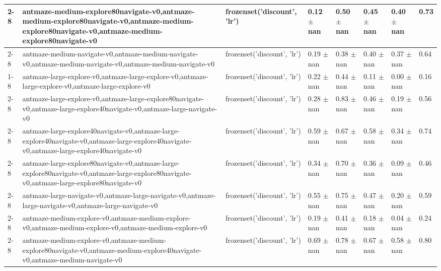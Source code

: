 \begin{tabular}{llllllll}
\cline{2-8}
 & antmaze-medium-explore80navigate-v0,antmaze-medium-explore80navigate-v0,antmaze-medium-explore80navigate-v0,antmaze-medium-explore80navigate-v0 & frozenset({'discount', 'lr'}) & 0.12 $\pm$ nan & 0.50 $\pm$ nan & 0.45 $\pm$ nan & 0.40 $\pm$ nan & 0.73 \\
\cline{2-8}
 & antmaze-medium-navigate-v0,antmaze-medium-navigate-v0,antmaze-medium-navigate-v0,antmaze-medium-navigate-v0 & frozenset({'discount', 'lr'}) & 0.19 $\pm$ nan & 0.38 $\pm$ nan & 0.40 $\pm$ nan & 0.37 $\pm$ nan & 0.64 \\
\cline{1-8} \cline{2-8}
\multirow[t]{10}{*}{QRL} & antmaze-large-explore-v0,antmaze-large-explore-v0,antmaze-large-explore-v0,antmaze-large-explore-v0 & frozenset({'discount', 'lr'}) & 0.22 $\pm$ nan & 0.44 $\pm$ nan & 0.11 $\pm$ nan & 0.00 $\pm$ nan & 0.16 \\
\cline{2-8}
 & antmaze-large-explore-v0,antmaze-large-explore80navigate-v0,antmaze-large-explore40navigate-v0,antmaze-large-navigate-v0 & frozenset({'discount', 'lr'}) & 0.28 $\pm$ nan & 0.83 $\pm$ nan & 0.46 $\pm$ nan & 0.19 $\pm$ nan & 0.56 \\
\cline{2-8}
 & antmaze-large-explore40navigate-v0,antmaze-large-explore40navigate-v0,antmaze-large-explore40navigate-v0,antmaze-large-explore40navigate-v0 & frozenset({'discount', 'lr'}) & 0.59 $\pm$ nan & 0.67 $\pm$ nan & 0.58 $\pm$ nan & 0.34 $\pm$ nan & 0.74 \\
\cline{2-8}
 & antmaze-large-explore80navigate-v0,antmaze-large-explore80navigate-v0,antmaze-large-explore80navigate-v0,antmaze-large-explore80navigate-v0 & frozenset({'discount', 'lr'}) & 0.34 $\pm$ nan & 0.70 $\pm$ nan & 0.36 $\pm$ nan & 0.09 $\pm$ nan & 0.46 \\
\cline{2-8}
 & antmaze-large-navigate-v0,antmaze-large-navigate-v0,antmaze-large-navigate-v0,antmaze-large-navigate-v0 & frozenset({'discount', 'lr'}) & 0.55 $\pm$ nan & 0.75 $\pm$ nan & 0.47 $\pm$ nan & 0.20 $\pm$ nan & 0.59 \\
\cline{2-8}
 & antmaze-medium-explore-v0,antmaze-medium-explore-v0,antmaze-medium-explore-v0,antmaze-medium-explore-v0 & frozenset({'discount', 'lr'}) & 0.19 $\pm$ nan & 0.41 $\pm$ nan & 0.18 $\pm$ nan & 0.04 $\pm$ nan & 0.24 \\
\cline{2-8}
 & antmaze-medium-explore-v0,antmaze-medium-explore80navigate-v0,antmaze-medium-explore40navigate-v0,antmaze-medium-navigate-v0 & frozenset({'discount', 'lr'}) & 0.69 $\pm$ nan & 0.78 $\pm$ nan & 0.67 $\pm$ nan & 0.58 $\pm$ nan & 0.80 \\

\end{tabular}
